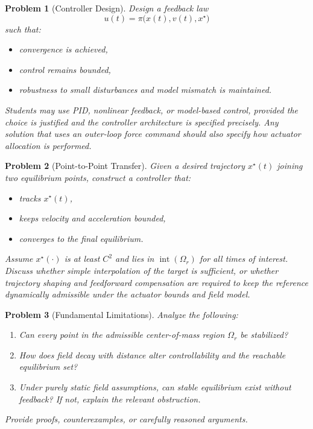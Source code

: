 \documentclass[11pt]{article}
\newtheorem{problem}{Problem}
\begin{document}
\begin{problem}[Controller Design]
Design a feedback law
\[
 u(t)=\pi\bigl(x(t),v(t),x^\star\bigr)
\]
such that:
\begin{itemize}[leftmargin=1.5em]
    \item convergence is achieved,
    \item control remains bounded,
    \item robustness to small disturbances and model mismatch is maintained.
\end{itemize}
Students may use PID, nonlinear feedback, or model-based control, provided the choice is justified and the controller architecture is specified precisely. Any solution that uses an outer-loop force command should also specify how actuator allocation is performed.
\end{problem}

\begin{problem}[Point-to-Point Transfer]
Given a desired trajectory $x^\star(t)$ joining two equilibrium points, construct a controller that:
\begin{itemize}[leftmargin=1.5em]
    \item tracks $x^\star(t)$,
    \item keeps velocity and acceleration bounded,
    \item converges to the final equilibrium.
\end{itemize}
Assume $x^\star(\cdot)$ is at least $C^2$ and lies in $\operatorname{int}(\Omega_r)$ for all times of interest. Discuss whether simple interpolation of the target is sufficient, or whether trajectory shaping and feedforward compensation are required to keep the reference dynamically admissible under the actuator bounds and field model.
\end{problem}

\begin{problem}[Fundamental Limitations]
Analyze the following:
\begin{enumerate}[label=\arabic*.]
    \item Can every point in the admissible center-of-mass region $\Omega_r$ be stabilized?
    \item How does field decay with distance alter controllability and the reachable equilibrium set?
    \item Under purely static field assumptions, can stable equilibrium exist without feedback? If not, explain the relevant obstruction.
\end{enumerate}
Provide proofs, counterexamples, or carefully reasoned arguments.
\end{problem}
\end{document}
